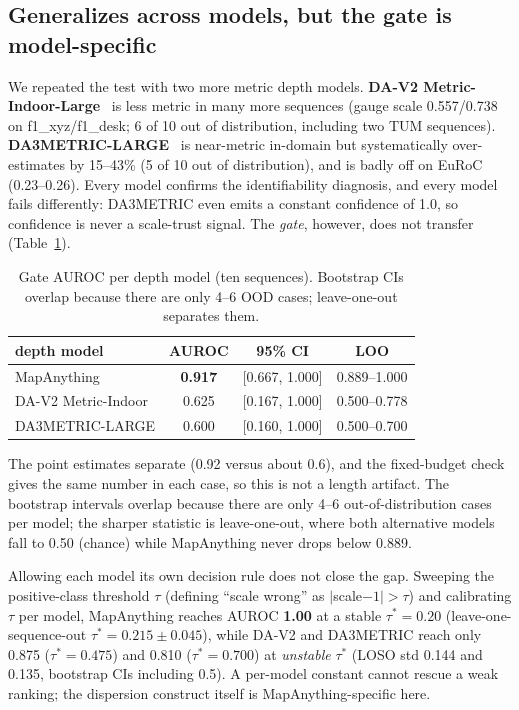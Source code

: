 \subsection{Generalizes across models, but the gate is model-specific}
\label{sec:model}

We repeated the test with two more metric depth models.
\textbf{DA-V2 Metric-Indoor-Large}~\cite{depthanythingv2} is less metric in many
more sequences (gauge scale 0.557/0.738 on f1\_xyz/f1\_desk; 6 of 10 out of
distribution, including two TUM sequences). \textbf{DA3METRIC-LARGE}~\cite{da3}
is near-metric in-domain but systematically over-estimates by 15--43\% (5 of 10
out of distribution), and is badly off on EuRoC (0.23--0.26). Every model
confirms the identifiability diagnosis, and every model fails differently:
DA3METRIC even emits a constant confidence of 1.0, so confidence is never a
scale-trust signal. The \emph{gate}, however, does not transfer
(Table~\ref{tab:models}).

\begin{table}[t]
\centering
\caption{Gate AUROC per depth model (ten sequences). Bootstrap CIs overlap
because there are only 4--6 OOD cases; leave-one-out separates them.}
\label{tab:models}
\footnotesize
\setlength{\tabcolsep}{4pt}
\begin{tabular}{@{}lccc@{}}
\toprule
depth model & AUROC & 95\% CI & LOO \\
\midrule
MapAnything & \textbf{0.917} & [0.667, 1.000] & 0.889--1.000 \\
DA-V2 Metric-Indoor & 0.625 & [0.167, 1.000] & 0.500--0.778 \\
DA3METRIC-LARGE & 0.600 & [0.160, 1.000] & 0.500--0.700 \\
\bottomrule
\end{tabular}
\end{table}

\noindent The point estimates separate (0.92 versus about 0.6), and the
fixed-budget check gives the same number in each case, so this is not a length
artifact. The bootstrap intervals overlap because there are only 4--6
out-of-distribution cases per model; the sharper statistic is leave-one-out,
where both alternative models fall to 0.50 (chance) while MapAnything never drops
below 0.889.

Allowing each model its own decision rule does not close the gap. Sweeping the
positive-class threshold $\tau$ (defining ``scale wrong'' as $|$scale$-1|>\tau$)
and calibrating $\tau$ per model, MapAnything reaches AUROC \textbf{1.00} at a
stable $\tau^\ast=0.20$ (leave-one-sequence-out $\tau^\ast=0.215\pm0.045$), while
DA-V2 and DA3METRIC reach only 0.875 ($\tau^\ast=0.475$) and 0.810
($\tau^\ast=0.700$) at \emph{unstable} $\tau^\ast$ (LOSO std 0.144 and 0.135,
bootstrap CIs including 0.5). A per-model constant cannot rescue a weak ranking;
the dispersion construct itself is MapAnything-specific here.

